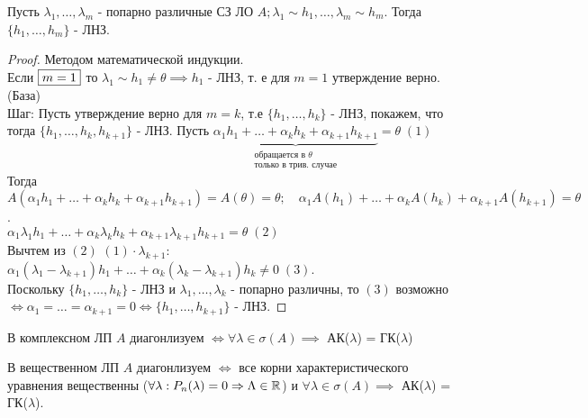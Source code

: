\documentclass[../main.tex]{subfiles}
\begin{document}
\begin{theorem}
    Пусть $\lambda_{1}, \dots ,\lambda_{m}$ - попарно различные СЗ ЛО $A; \lambda_{1} \sim h_{1}, \dots , \lambda_{m} \sim h_{m}$. Тогда $\{h_{1}, \dots , h_{m}\}$ - ЛНЗ. 
\end{theorem}
\begin{proof}
    Методом математической индукции.
    \\Если $\fbox{$m=1$}$ то $\lambda_{1} \sim h_{1} \neq  \theta \implies h_{1}$ - ЛНЗ, т. е для $m=1$ утверждение верно. (База) 
    \\Шаг: Пусть утверждение верно для $m=k$, т.е $\{h_{1},\dots,h_{k}\} $ - ЛНЗ, покажем, что тогда $\{h_{1},\dots,h_{k},h_{k+1}\}$ - ЛНЗ. Пусть $\underbrace{\alpha_{1}h_{1} + \dots + \alpha_{k}h_{k}+ \alpha_{k+1}h_{k+1}}_{\substack{\text{обращается в $\theta$}\\\text{только в трив. случае}}} = \theta\;(1)$
    \\Тогда $A(\alpha_{1}h_{1} + \dots + \alpha_{k}h_{k}+ \alpha_{k+1}h_{k+1}) = A(\theta) = \theta;\quad \alpha_{1}A(h_{1}) + \dots + \alpha_{k}A(h_{k})+ \alpha_{k+1}A(h_{k+1}) = \theta$. 
    \\$\alpha_{1}\lambda_{1}h_{1} + \dots + \alpha_{k}\lambda_{k}h_{k}+ \alpha_{k+1}\lambda_{k+1}h_{k+1} = \theta\;(2)$
    \\Вычтем из $(2)$ $(1)\cdot \lambda_{k+1}$: $\alpha_{1}(\lambda_{1}-\lambda_{k+1})h_{1} + \dots + \alpha_{k}(\lambda_{k}-\lambda_{k+1})h_{k}\neq  0\;(3)$. 
    \\Поскольку $\{h_{1}, \dots,h_{k} \}$ - ЛНЗ и $\lambda_{1},\dots,\lambda_{k}$ - попарно различны, то $(3)$ возможно $\Leftrightarrow \alpha_{1} = \dots = \alpha_{k+1} = 0 \Leftrightarrow \{h_{1},\dots,h_{k+1}\}$ - ЛНЗ. 
\end{proof}
\begin{corollary}
    В комплексном ЛП $A$ диагонлизуем $\Leftrightarrow \forall \lambda \in \sigma(A) \implies$ АК($\lambda$) = ГК($\lambda$)
\end{corollary}
\begin{corollary}
    В вещественном ЛП $A$ диагонлизуем $\Leftrightarrow$ все корни характеристического уравнения вещественны ($\forall \lambda : P_{n}(\lambda)= 0 \Rightarrow \Lambda \in \mathbb{R}$) и $\forall \lambda \in \sigma(A) \implies$ АК($\lambda$) = ГК($\lambda$).
\end{corollary}
\end{document}
